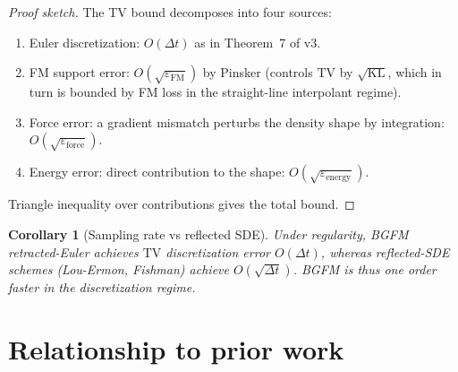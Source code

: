 \documentclass[11pt]{article}
\newtheorem{corollary}[theorem]{Corollary}
\theoremstyle{remark}
\theoremstyle{plain}
\newcommand{\FM}{\mathrm{FM}}
\newcommand{\force}{\mathrm{force}}
\newcommand{\energy}{\mathrm{energy}}
\newcommand{\TV}{\mathrm{TV}}
\newcommand{\KL}{\mathrm{KL}}
\begin{document}
\begin{proof}[Proof sketch]
The TV bound decomposes into four sources:
\begin{enumerate}
\item Euler discretization: $O(\Delta t)$ as in Theorem~7 of v3.
\item FM support error: $O(\sqrt{\varepsilon_\FM})$ by Pinsker
      (controls $\TV$ by $\sqrt{\KL}$, which in turn is bounded by FM
      loss in the straight-line interpolant regime).
\item Force error: a gradient mismatch perturbs the density shape by
      integration: $O(\sqrt{\varepsilon_\force})$.
\item Energy error: direct contribution to the shape: $O(\sqrt{\varepsilon_\energy})$.
\end{enumerate}
Triangle inequality over contributions gives the total bound.
\end{proof}

\begin{corollary}[Sampling rate vs reflected SDE]
Under regularity, BGFM retracted-Euler achieves $\TV$ discretization
error $O(\Delta t)$, whereas reflected-SDE schemes (Lou-Ermon,
Fishman) achieve $O(\sqrt{\Delta t})$. BGFM is thus one order faster
in the discretization regime.
\end{corollary}

\section{Relationship to prior work}
\end{document}
